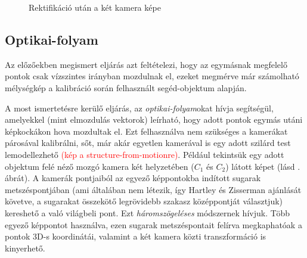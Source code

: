 \begin{figure}[tbh]
  \centering
{}
  \caption{Rektifikáció után a két kamera képe \label{fig:stereo-calibration-after}}
\end{figure}

\subsection{Optikai-folyam}

Az előzőekben megismert eljárás azt feltételezi, hogy az egymásnak megfelelő pontok csak vízszintes irányban mozdulnak el, ezeket megmérve már számolható mélységkép a kalibráció során felhasznált segéd-objektum alapján.

A most ismertetésre kerülő eljárás, az \textit{optikai-folyam}okat hívja segítségül, amelyekkel (mint elmozdulás vektorok) leírható, hogy adott pontok egymás utáni képkockákon hova mozdultak el. Ezt felhasználva nem szükséges a kamerákat párosával kalibrálni, sőt, már akár egyetlen kamerával is egy adott szilárd test lemodellezhető \textcolor{red}{(kép a structure-from-motionre)}. Például tekintsük egy adott objektum felé néző mozgó kamera két helyzetében ($C_1$ és $C_2$) látott képet (lásd . ábrát). A kamerák pontjaiból az egyező képpontokba indított sugarak metszéspontjában (ami általában nem létezik, így Hartley és Zisserman \cite{HZ} ajánlását követve, a sugarakat összekötő legrövidebb szakasz középpontját választjuk) kereshető a való világbeli pont. Ezt \textit{háromszögeléses} módszernek hívjuk. Több egyező képpontot használva, ezen sugarak metszéspontait felírva megkaphatóak a pontok 3D-s koordinátái, valamint a két kamera közti transzformáció is kinyerhető. 

